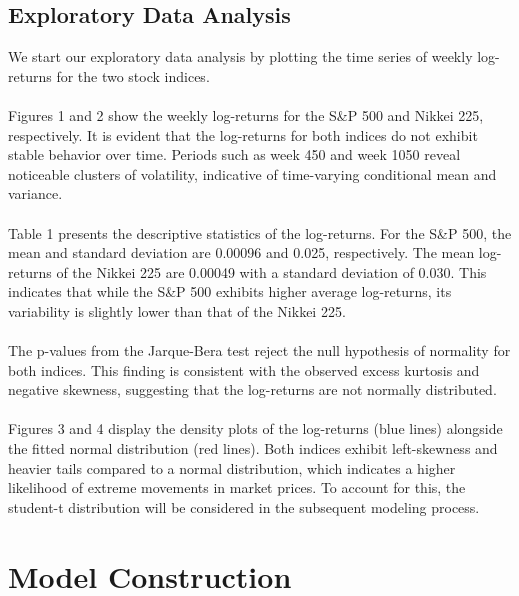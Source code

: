 \documentclass{article}
\begin{document}
\subsection{Exploratory Data Analysis}
We start our exploratory data analysis by plotting the time series of weekly log-returns for the two stock indices.\\
\\
Figures 1 and 2 show the weekly log-returns for the S\&P 500 and Nikkei 225, respectively. It is evident that the log-returns for both indices do not exhibit stable behavior over time. Periods such as week 450 and week 1050 reveal noticeable clusters of volatility, indicative of time-varying conditional mean and variance. \\
\\
Table 1 presents the descriptive statistics of the log-returns. For the S\&P 500, the mean and standard deviation are 0.00096 and 0.025, respectively. The mean log-returns of the Nikkei 225 are 0.00049 with a standard deviation of 0.030. This indicates that while the S\&P 500 exhibits higher average log-returns, its variability is slightly lower than that of the Nikkei 225. \\
\\
The p-values from the Jarque-Bera test reject the null hypothesis of normality for both indices. This finding is consistent with the observed excess kurtosis and negative skewness, suggesting that the log-returns are not normally distributed. \\
\\
Figures 3 and 4 display the density plots of the log-returns (blue lines) alongside the fitted normal distribution (red lines). Both indices exhibit left-skewness and heavier tails compared to a normal distribution, which indicates a higher likelihood of extreme movements in market prices. To account for this, the student-t distribution will be considered in the subsequent modeling process.

\section{Model Construction}
\end{document}
